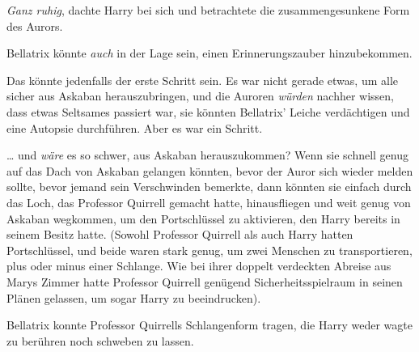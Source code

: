 \emph{Ganz ruhig}, dachte Harry bei sich und betrachtete die zusammengesunkene Form des Aurors.

Bellatrix könnte \emph{auch} in der Lage sein, einen Erinnerungszauber hinzubekommen.

Das könnte jedenfalls der erste Schritt sein. Es war nicht gerade etwas, um alle sicher aus Askaban herauszubringen, und die Auroren \emph{würden} nachher wissen, dass etwas Seltsames passiert war, sie könnten Bellatrix’ Leiche verdächtigen und eine Autopsie durchführen. Aber es war ein Schritt.

… und \emph{wäre} es so schwer, aus Askaban herauszukommen? Wenn sie schnell genug auf das Dach von Askaban gelangen könnten, bevor der Auror sich wieder melden sollte, bevor jemand sein Verschwinden bemerkte, dann könnten sie einfach durch das Loch, das Professor Quirrell gemacht hatte, hinausfliegen und weit genug von Askaban wegkommen, um den Portschlüssel zu aktivieren, den Harry bereits in seinem Besitz hatte. (Sowohl Professor Quirrell als auch Harry hatten Portschlüssel, und beide waren stark genug, um zwei Menschen zu transportieren, plus oder minus einer Schlange. Wie bei ihrer doppelt verdeckten Abreise aus Marys Zimmer hatte Professor Quirrell genügend Sicherheitsspielraum in seinen Plänen gelassen, um sogar Harry zu beeindrucken).

Bellatrix konnte Professor Quirrells Schlangenform tragen, die Harry weder wagte zu berühren noch schweben zu lassen.

